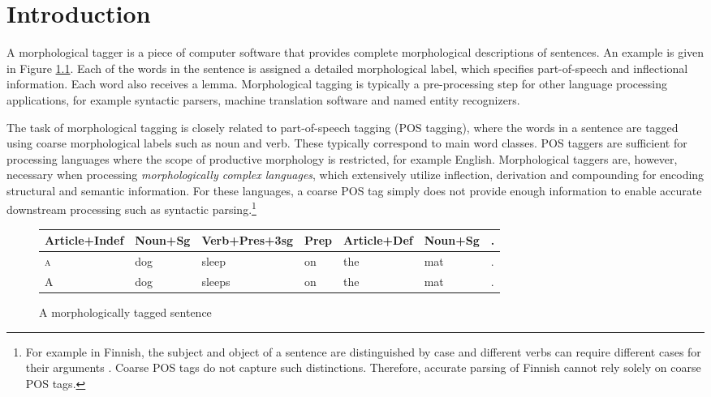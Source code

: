 \chapter{Introduction}
\label{ch:intro}

A morphological tagger is a piece of computer software that provides
complete morphological descriptions of sentences. An example is given
in Figure \ref{fig:mt-example}. Each of the words in the sentence is
assigned a detailed morphological label, which specifies
part-of-speech and inflectional information. Each word also receives a
lemma. Morphological tagging is typically a pre-processing step for
other language processing applications, for example syntactic parsers,
machine translation software and named entity recognizers.

The task of morphological tagging is closely related to part-of-speech
tagging (POS tagging), where the words in a sentence are tagged using
coarse morphological labels such as noun and verb. These typically
correspond to main word classes. POS taggers are sufficient for
processing languages where the scope of productive morphology is
restricted, for example English. Morphological taggers are, however,
necessary when processing {\it morphologically complex languages}, which
extensively utilize inflection, derivation and compounding for
encoding structural and semantic information. For these languages, a
coarse POS tag simply does not provide enough information to enable
accurate downstream processing such as syntactic parsing.\footnote{For
  example in Finnish, the subject and object of a sentence are
  distinguished by case and different verbs can require different
  cases for their arguments \cite{Hakulinen2004}. Coarse POS tags do
  not capture such distinctions. Therefore, accurate parsing of
  Finnish cannot rely solely on coarse POS tags.}

\begin{figure}[!htb]
\begin{center}
\begin{tabular}{|l|l|l|l|l|l|l|}
\hline
Article+Indef & Noun+Sg & Verb+Pres+3sg & Prep & Article+Def & Noun+Sg & .\\  
\hline
\textsc{a} & dog & sleep & on & the & mat & .\\
\hline
A & dog & sleeps & on & the & mat & .\\
\hline
\end{tabular}
\end{center}
\caption{A morphologically tagged sentence}\label{fig:mt-example}
\end{figure}

